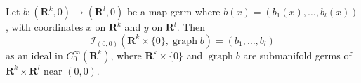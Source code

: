 Let $b: (\mathbf{R}^k, 0) \to (\mathbf{R}^l, 0)$ be a map germ where $b(x) = (b_1(x), \ldots, b_l(x))$, with coordinates $x$ on $\mathbf{R}^k$ and $y$ on $\mathbf{R}^l$. Then
$$
\mathcal{I}_{(0,0)}(\mathbf{R}^k \times \{0\}, \operatorname{graph} b) = (b_1, \ldots, b_l)
$$
as an ideal in $C_0^\infty(\mathbf{R}^k)$, where $\mathbf{R}^k \times \{0\}$ and $\operatorname{graph} b$ are submanifold germs of $\mathbf{R}^k \times \mathbf{R}^l$ near $(0, 0)$.
